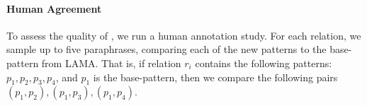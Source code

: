 










\paragraph{Human Agreement}
To assess the quality of \resource{}, we run a
human annotation study.
For each relation, we sample up to
five paraphrases, comparing each of the new patterns to the
base-pattern from LAMA.
That is, if relation $r_i$ contains the following patterns:
$p_1, p_2, p_3, p_4$, and $p_1$ is the
base-pattern, then we compare the following pairs $(p_1, p_2), (p_1, p_3), (p_1,p_4)$.

